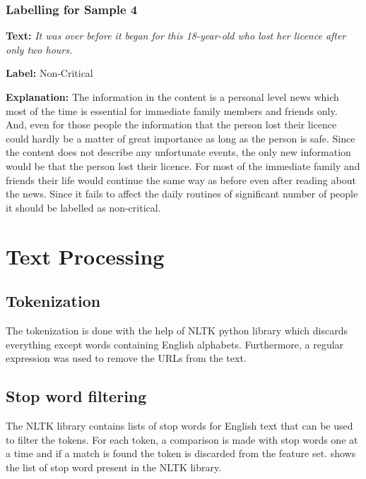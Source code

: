 \subsubsection{Labelling for Sample 4}
\textbf{Text:}
\textit{It was over before it began for this 18-year-old who lost her licence after only two hours.}\par
\textbf{Label:} Non-Critical\par
\textbf{Explanation:} The information in the content is a personal level news which most of the time is essential for immediate family members and friends only. And, even for those people the information that the person lost their licence could hardly be a matter of great importance as long as the person is safe. Since the content does not describe any unfortunate events, the only new information would be that the person lost their licence. For most of the immediate family and friends their life would continue the same way as before even after reading about the news. Since it fails to affect the daily routines of significant number of people it should be labelled as non-critical.

\section{Text Processing}
\subsection{Tokenization}
The tokenization is done with the help of NLTK\cite{loper2002nltk} python library which discards everything except words containing English alphabets. Furthermore, a regular expression was used to remove the URLs from the text.

\subsection{Stop word filtering}
The NLTK library contains lists of stop words for English text that can be used to filter the tokens. For each token, a comparison is made with stop words one at a time and if a match is found the token is discarded from the feature set.  shows the list of stop word present in the NLTK library.

